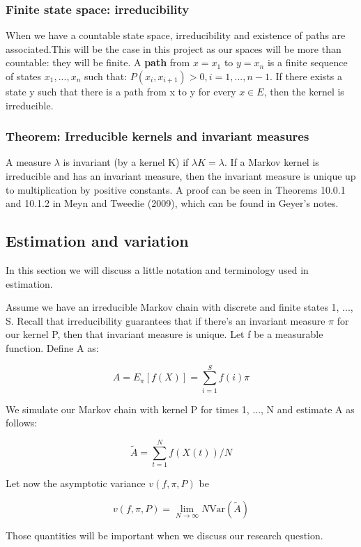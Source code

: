 \subsubsection{Finite state space: irreducibility}
When we have a countable state space, irreducibility and existence of paths are associated.This will be the case in this project as our spaces will be more than countable: they will be finite. A \textbf{path} from $x = x_1$ to $y = x_n$ is a finite sequence of states $x_1, ..., x_n$ such that:
$ P (x_i, x_{i+1}) > 0, i = 1, ... , n - 1$.
If there exists a state y such that there is a path from x to y for every $x \in E$, then the kernel is irreducible.

\subsubsection{Theorem: Irreducible kernels and invariant measures}
A measure $\lambda$ is invariant (by a kernel K) if $\lambda K = \lambda$. If a Markov kernel is irreducible and has an invariant measure, then the invariant measure is unique up to multiplication by positive constants. A proof can be seen in Theorems 10.0.1 and 10.1.2 in Meyn and Tweedie (2009), which can be found in Geyer's notes.


\subsection{Estimation and variation}
In this section we will discuss a little notation and terminology used in estimation.

Assume we have an irreducible Markov chain with discrete and finite states 1, ..., S. Recall that irreducibility guarantees that if there's an invariant measure $\pi$ for our kernel P, then that invariant measure is unique. Let f be a measurable function. Define A as:

\[
A = E_{\pi}[f(X)] =  \sum_{i=1}^S f(i) \pi
\]

We simulate our Markov chain with kernel P for times 1, ..., N and estimate A as follows:

\[
\tilde{A} = \sum_{t=1}^N f(X(t)) / N
\]

Let now the asymptotic variance $v(f, \pi, P)$ be

\[
v(f, \pi, P) = \lim_{N \rightarrow \infty } N \text{Var}(\tilde{A})
\]

Those quantities will be important when we discuss our research question.